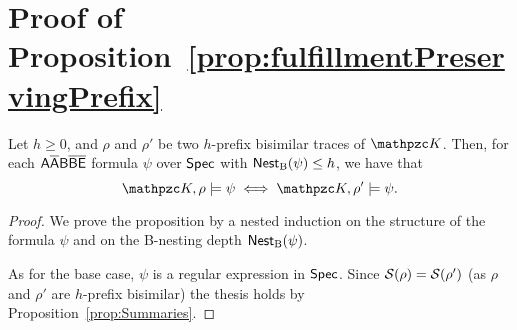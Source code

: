 \section{Proof of Proposition~\ref{prop:fulfillmentPreservingPrefix}}
\label{proof:prop:fulfillmentPreservingPrefix}

\begin{proposition*}[\ref{prop:fulfillmentPreservingPrefix}] Let $h\geq 0$, and $\rho$ and $\rho'$ be two $h$-prefix bisimilar traces of $\Ku$. Then, for each $\mathsf{A\overline{A}B\overline{B}\overline{E}}$
formula $\psi$ over $\textsf{Spec}$ with $\operatorname{\mathsf{Nest}_B}(\psi)\leq h$, we have that
\[\Ku,\rho\models\psi\iff \Ku,\rho'\models\psi.\]
\end{proposition*}

\begin{proof}
We prove the proposition by a nested induction on the structure of the formula $\psi$ and on the B-nesting depth $\operatorname{\mathsf{Nest}_B}(\psi)$. 

As for the base case, $\psi$ is a regular expression in $\textsf{Spec}$. Since $\mathcal{S}(\rho)=\mathcal{S}(\rho')$ (as $\rho$ and $\rho'$ are $h$-prefix bisimilar) the thesis holds  by Proposition~\ref{prop:Summaries}.


\end{proof}
